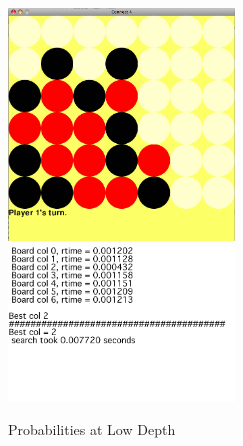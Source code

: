 \documentclass[12pt]{article}
\begin{document}
\begin{figure}[h!]
        \begin{center}
		\includegraphics[width=60mm]{report_images/prob_play.png}
		\includegraphics[width=60mm]{report_images/prob_play_text.png}
                	\caption{Probabilities at Low Depth}
                	\label{prob_play}
        \end{center}
\end{figure}
\end{document}
